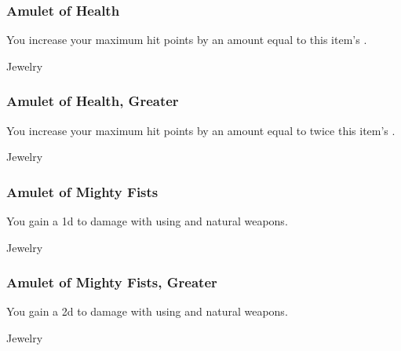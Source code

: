 
\lowercase{\hypertarget{item:Amulet of Health}{}}\label{item:Amulet of Health}
\hypertarget{item:Amulet of Health}{\subsubsection{Amulet of Health\hfill{}}}

You increase your maximum hit points by an amount equal to this item's .



 Jewelry


\lowercase{\hypertarget{item:Amulet of Health, Greater}{}}\label{item:Amulet of Health, Greater}
\hypertarget{item:Amulet of Health, Greater}{\subsubsection{Amulet of Health, Greater\hfill{}}}

You increase your maximum hit points by an amount equal to twice this item's .



 Jewelry


\lowercase{\hypertarget{item:Amulet of Mighty Fists}{}}\label{item:Amulet of Mighty Fists}
\hypertarget{item:Amulet of Mighty Fists}{\subsubsection{Amulet of Mighty Fists\hfill{}}}

You gain a \plus1d  to damage with  using  and natural weapons.



 Jewelry


\lowercase{\hypertarget{item:Amulet of Mighty Fists, Greater}{}}\label{item:Amulet of Mighty Fists, Greater}
\hypertarget{item:Amulet of Mighty Fists, Greater}{\subsubsection{Amulet of Mighty Fists, Greater\hfill{}}}

You gain a \plus2d  to damage with  using  and natural weapons.



 Jewelry


